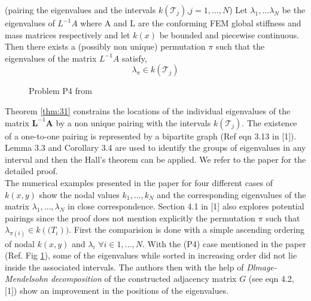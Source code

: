 \begin{theorem}{(pairing the eigenvalues and the intervals $k(\mathcal{T}_j)$,$ j=1,...,N$)}
  \label{thm:31}
Let $\lambda_1,...\lambda_N$ be the eigenvalues of $L^{-1}A$ where A and L are the conforming FEM global stiffness and mass matrices respectively and let $k(x)$ be bounded and piecewise continuous. Then there exists a (possibly non unique) permutation $\pi$ such that the eigenvalues of the matrix $L^{-1}A$ satisfy, 
$$\lambda_{\pi} \in k(\mathcal{T}_j)$$
\end{theorem}

\begin{figure}%
    \centering
    \qquad
    \caption{Problem P4 from \cite{gergelits2019laplacian}}%
    \label{fig:example}%
\end{figure}

Theorem \ref{thm:31} constrains the locations of the individual eigenvalues of the matrix $\mathbf{L}^{-1}\mathbf{A}$ by a non unique pairing with the intervals $k(\mathcal{T}_j)$. The existence of a one-to-one pairing is represented by a bipartite graph (Ref eqn 3.13 in [1]). Lemma 3.3 and Corollary 3.4 are used to identify the groups of eigenvalues in any interval and then the Hall's theorem can be applied. We refer to the paper for the detailed proof. \\
The numerical examples presented in the paper for four different cases of $k(x,y)$
show the nodal values $k_{1},\dots,k_{N}$ and the corresponding eigenvalues of the matrix $\lambda_{1}, \dots, \lambda_{N}$ in close correspondence. Section 4.1 in [1] also explores potential pairings since the proof does not mention explicitly the permutation $\pi$ such that $\lambda_{\pi(i)} \in k(\mathcal(T_{i}))$. First the comparision is done with a simple ascending ordering of nodal $k(x,y)$ and $\lambda_{i}$ $\forall i \in {1,...,N}$. With the (P4) case mentioned in the paper (Ref. Fig \ref{fig:example}), some of the eigenvalues while sorted in increasing order did not lie inside the associated intervals. The authors then with the help of \emph{Dlmage-Mendelsohn decomposition} of the constructed adjacency matrix $G$ (see eqn 4.2, [1]) show an improvement in the positions of the eigenvalues. 

